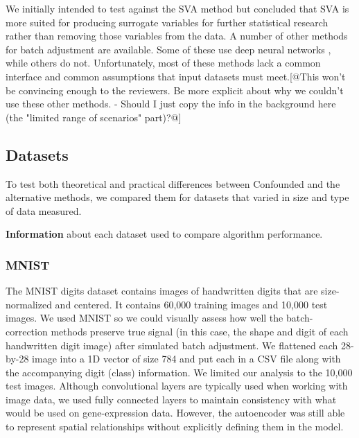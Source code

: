 \documentclass[11pt]{article}
\begin{document}
We initially intended to test against the SVA \citep{leek_capturing_2007} method but concluded that SVA is more suited for producing surrogate variables for further statistical research rather than removing those variables from the data.
A number of other methods for batch adjustment are available. Some of these use deep neural networks \citep{shaham_removal_2017,shaham_batch_2018,upadhyay_removal_2019}, while others do not\citep{espin-perez_comparison_2018}.
Unfortunately, most of these methods lack a common interface and common assumptions that input datasets must meet.[@This won't be convincing enough to the reviewers. Be more explicit about why we couldn't use these other methods. - Should I just copy the info in the background here (the "limited range of scenarios" part)?@]

\subsection{Datasets}

To test both theoretical and practical differences between Confounded and the alternative methods, we compared them for datasets that varied in size and type of data measured.

\begin{table}
	\centering
	\caption[Dataset information]{
		\textbf{Information} about each dataset used to compare algorithm performance.
	}
	
	\label{tab:datasets}
\end{table}

\subsubsection{MNIST}

The MNIST digits dataset \cite{lecun_mnist_nodate} contains images of handwritten digits that are size-normalized and centered.
It contains 60,000 training images and 10,000 test images.
We used MNIST so we could visually assess how well the batch-correction methods preserve true signal (in this case, the shape and digit of each handwritten digit image) after simulated batch adjustment.
We flattened each 28-by-28 image into a 1D vector of size 784 and put each in a CSV file along with the accompanying digit (class) information.
We limited our analysis to the 10,000 test images.
Although convolutional layers are typically used when working with image data, we used fully connected layers to maintain consistency with what would be used on gene-expression data.
However, the autoencoder was still able to represent spatial relationships without explicitly defining them in the model.
\end{document}

